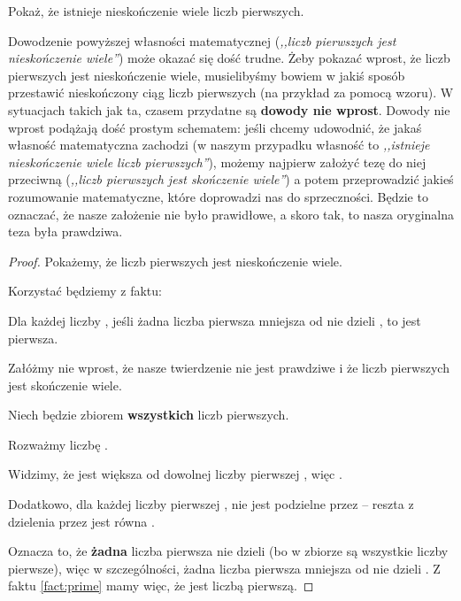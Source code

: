 \begin{example}
\label{example:indirect}
Pokaż, że istnieje nieskończenie wiele liczb pierwszych.

Dowodzenie powyższej własności matematycznej (\textit{,,liczb pierwszych jest nieskończenie wiele''}) może okazać się dość trudne. Żeby pokazać wprost, że liczb pierwszych jest nieskończenie wiele, musielibyśmy bowiem w jakiś sposób przestawić nieskończony ciąg liczb pierwszych (na przykład za pomocą wzoru). W sytuacjach takich jak ta, czasem przydatne są \textbf{dowody nie wprost}. Dowody nie wprost podążają dość prostym schematem: jeśli chcemy udowodnić, że jakaś własność matematyczna zachodzi (w naszym przypadku własność to \textit{,,istnieje nieskończenie wiele liczb pierwszych''}), możemy najpierw założyć tezę do niej przeciwną (\textit{,,liczb pierwszych jest skończenie wiele''}) a potem przeprowadzić jakieś rozumowanie matematyczne, które doprowadzi nas do sprzeczności. Będzie to oznaczać, że nasze założenie nie było prawidłowe, a skoro tak, to nasza oryginalna teza była prawdziwa.

\begin{proof}
Pokażemy, że liczb pierwszych jest nieskończenie wiele.

Korzystać będziemy z faktu:

\begin{fact}
Dla każdej liczby , jeśli żadna liczba pierwsza mniejsza od  nie dzieli , to  jest pierwsza.
\label{fact:prime}
\end{fact}

Załóżmy nie wprost, że nasze twierdzenie nie jest prawdziwe i że liczb pierwszych jest skończenie wiele.

Niech  będzie zbiorem \textbf{wszystkich} liczb pierwszych.

Rozważmy liczbę . 

Widzimy, że  jest większa od dowolnej liczby pierwszej , więc . 

Dodatkowo, dla każdej liczby pierwszej ,  nie jest podzielne przez  -- reszta z dzielenia  przez  jest równa . 

Oznacza to, że \textbf{żadna} liczba pierwsza nie dzieli  (bo w zbiorze  są wszystkie liczby pierwsze), więc w szczególności, żadna liczba pierwsza mniejsza od  nie dzieli . Z faktu \ref{fact:prime} mamy więc, że  jest liczbą pierwszą.


\end{proof}
\end{example}
